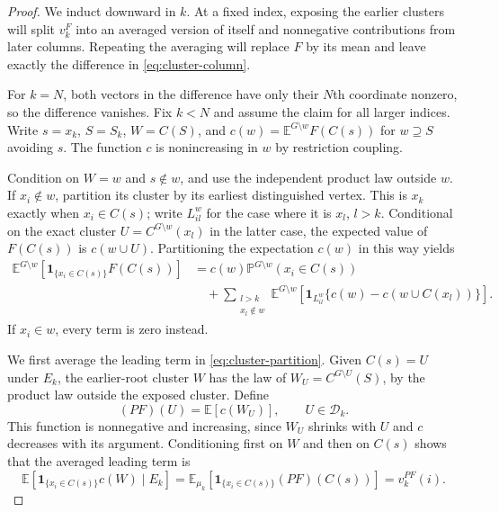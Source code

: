 \documentclass[11pt]{article}
\theoremstyle{definition}
\begin{document}
\begin{proof}
We induct downward in $k$. At a fixed index, exposing the earlier
clusters will split $v_k^F$ into an averaged version of itself and
nonnegative contributions from later columns. Repeating the averaging
will replace $F$ by its mean and leave exactly the difference in
\eqref{eq:cluster-column}.

For $k=N$, both vectors in the difference have only their $N$th
coordinate nonzero, so the difference vanishes. Fix $k<N$ and assume
the claim for all larger indices.  Write
$s=x_k$, $S=S_k$, $W=C(S)$, and
$c(w)=\mathbb E^{G\setminus w}F(C(s))$ for $w\supseteq S$ avoiding $s$.
The function $c$ is nonincreasing in $w$ by restriction coupling.

Condition on $W=w$ and $s\notin w$, and use the independent product
law outside $w$.  If $x_i\notin w$, partition its cluster by its earliest
distinguished vertex.  This is $x_k$ exactly when $x_i\in C(s)$;
write $L_{il}^w$ for the case where it is $x_l$, $l>k$.
Conditional on the exact cluster $U=C^{G\setminus w}(x_l)$ in the latter
case, the expected value of $F(C(s))$ is $c(w\cup U)$.
Partitioning the expectation $c(w)$ in this way yields
\begin{equation}
\label{eq:cluster-partition}
\begin{split}
 \mathbb E^{G\setminus w}
    [\mathbf1_{\{x_i\in C(s)\}}F(C(s))]
 &=c(w)\mathbb P^{G\setminus w}(x_i\in C(s))\\
 &\quad+\sum_{\substack{l>k\\x_l\notin w}}\mathbb E^{G\setminus w}
  [\mathbf1_{L_{il}^w}\{c(w)-c(w\cup C(x_l))\}].
\end{split}
\end{equation}
If $x_i\in w$, every term is zero instead.

We first average the leading term in \eqref{eq:cluster-partition}.
Given $C(s)=U$ under $E_k$, the earlier-root cluster $W$ has the law of
$W_U=C^{G\setminus U}(S)$, by the product law outside the exposed
cluster. Define
\[
 (PF)(U)=\mathbb E[c(W_U)],\qquad U\in\mathcal D_k.
\]
This function is nonnegative and increasing, since $W_U$ shrinks with
$U$ and $c$ decreases with its argument. Conditioning first on $W$ and
then on $C(s)$ shows that the averaged leading term is
\[
 \mathbb E[\mathbf1_{\{x_i\in C(s)\}}c(W)\mid E_k]
 =\mathbb E_{\mu_k}[\mathbf1_{\{x_i\in C(s)\}}(PF)(C(s))]
 =v_k^{PF}(i).
\]


\end{proof}
\end{document}

